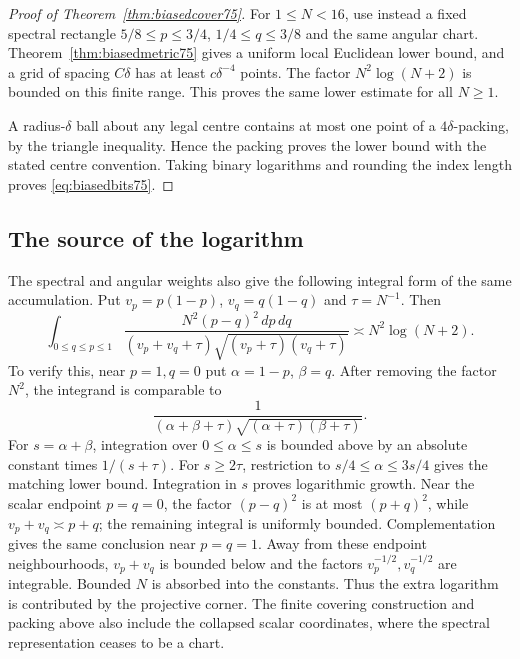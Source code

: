 \begin{proof}[Proof of Theorem~\ref{thm:biasedcover75}]
For $1\le N<16$, use instead a fixed spectral rectangle
$5/8\le p\le3/4$, $1/4\le q\le3/8$ and the same angular chart.
Theorem~\ref{thm:biasedmetric75} gives a uniform local Euclidean lower
bound, and a grid of spacing $C\delta$ has at least $c\delta^{-4}$
points. The factor $N^2\log(N+2)$ is bounded on this finite range.
This proves the same lower estimate for all $N\ge1$.

A radius-$\delta$ ball about any legal centre contains at most one
point of a $4\delta$-packing, by the triangle inequality. Hence the
packing proves the lower bound with the stated centre convention.
Taking binary logarithms and rounding the index length proves
\eqref{eq:biasedbits75}.
\end{proof}

\subsection{The source of the logarithm}
The spectral and angular weights also give the following integral
form of the same accumulation. Put $v_p=p(1-p)$, $v_q=q(1-q)$ and
$\tau=N^{-1}$. Then
\begin{equation}\label{eq:biasedvolume75}
 \int_{0\le q\le p\le1}
 \frac{N^2(p-q)^2\,dp\,dq}
 {(v_p+v_q+\tau)\sqrt{(v_p+\tau)(v_q+\tau)}}
                         \asymp N^2\log(N+2).
\end{equation}
To verify this, near $p=1,q=0$ put $\alpha=1-p$, $\beta=q$.
After removing the factor $N^2$, the integrand is comparable to
\[
 \frac1{(\alpha+\beta+\tau)
             \sqrt{(\alpha+\tau)(\beta+\tau)}}.
\]
For $s=\alpha+\beta$, integration over $0\le\alpha\le s$ is
bounded above by an absolute constant times $1/(s+\tau)$.
For $s\ge2\tau$, restriction to $s/4\le\alpha\le3s/4$ gives the
matching lower bound. Integration in $s$ proves logarithmic growth.
Near the scalar endpoint $p=q=0$, the factor $(p-q)^2$ is at most
$(p+q)^2$, while $v_p+v_q\asymp p+q$; the remaining integral is
uniformly bounded. Complementation gives the same conclusion near
$p=q=1$. Away from these endpoint neighbourhoods,
$v_p+v_q$ is bounded below and the factors $v_p^{-1/2},v_q^{-1/2}$
are integrable. Bounded $N$ is absorbed into the constants.
Thus the extra logarithm is contributed by the projective corner.
The finite covering construction and packing above also include the
collapsed scalar coordinates, where the spectral representation
ceases to be a chart.
